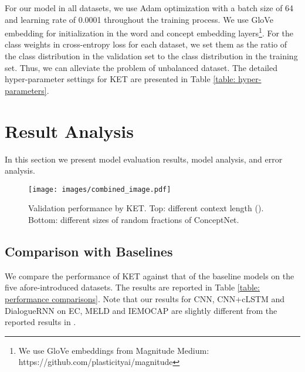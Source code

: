 \documentclass[11pt,a4paper]{article}
\begin{document}
For our model in all datasets, we use Adam optimization \cite{kingma2014adam} with a batch size of 64 and learning rate of 0.0001 throughout the training process. We use GloVe embedding \cite{pennington2014glove} for initialization in the word and concept embedding layers\footnote{We use GloVe embeddings from Magnitude Medium: https://github.com/plasticityai/magnitude}. 
For the class weights in cross-entropy loss for each dataset, we set them as the ratio of the class distribution in the validation set to the class distribution in the training set. Thus, we can alleviate the problem of unbalanced dataset.
The detailed hyper-parameter settings for KET are presented in Table \ref{table: hyper-parameters}. 
\section{Result Analysis}
\label{result analysis}
In this section we present model evaluation results, model analysis, and error analysis.

\begin{figure*}[!t]
\centering
\texttt{[image: images/combined\_image.pdf]}
\caption{Validation performance by KET. Top: different context length (). Bottom: different sizes of random fractions of ConceptNet.}
\label{fig: KBs}
\end{figure*}
\subsection{Comparison with Baselines}
\label{sec: comparison with baselines}
We compare the performance of KET against that of the baseline models on the five afore-introduced datasets. The results are reported in Table \ref{table: performance comparisons}. Note that our results for CNN, CNN+cLSTM and DialogueRNN on EC, MELD and IEMOCAP are slightly different from the reported results in \cite{majumder2018dialoguernn, poria2019emotion}.
\end{document}

